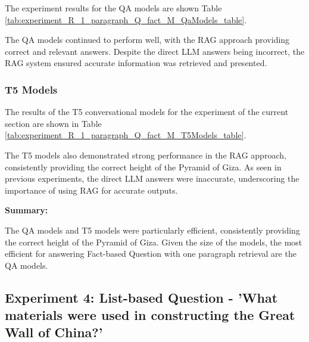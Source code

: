 \documentclass{wseas}
\begin{document}
The experiment results for the QA models are shown Table \ref{tab:experiment_R_1_paragraph_Q_fact_M_QaModels_table}.

The QA models continued to perform well, with the RAG approach providing
correct and relevant answers. Despite the direct LLM answers being
incorrect, the RAG system ensured accurate information was retrieved and
presented.

\subsubsection{T5 Models}



The results of the T5 conversational models for the experiment of the current section 
are shown in Table \ref{tab:experiment_R_1_paragraph_Q_fact_M_T5Models_table}.

The T5 models also demonstrated strong performance in the RAG approach,
consistently providing the correct height of the Pyramid of Giza. As
seen in previous experiments, the direct LLM answers were inaccurate,
underscoring the importance of using RAG for accurate outputs.

\textbf{Summary:}

The QA models and T5 models were particularly efficient, consistently
providing the correct height of the Pyramid of Giza. Given the size of
the models, the most efficient for answering Fact-based Question with
one paragraph retrieval are the QA models.

\subsection{Experiment 4: List-based Question - 'What materials were
used in constructing the Great Wall of China?'}
\end{document}
